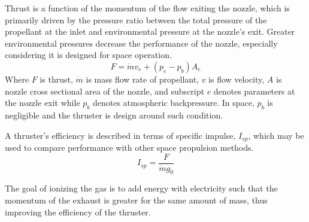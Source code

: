 \documentclass[journal]{IEEEtran}
\begin{document}

Thrust is a function of the momentum of the flow exiting the nozzle, which is primarily driven by the pressure ratio between the total pressure of the propellant at the inlet and environmental pressure at the nozzle's exit.
Greater environmental pressures decrease the performance of the nozzle, especially considering it is designed for space operation.
\begin{equation}
\label{eq:thrust}
  F=\dot{m}v_e + (p_e-p_b)A_e
\end{equation}
 Where $F$ is thrust, $\dot{m}$ is mass flow rate of propellant, $v$ is flow velocity, $A$ is nozzle cross sectional area of the nozzle, and subscript $e$ denotes parameters at the nozzle exit while $p_b$ denotes atmospheric backpressure.
 In space, $p_b$ is negligible and the thruster is design around such condition.

 A thruster's efficiency is described in terms of specific impulse, $I_{sp}$, which may be used to compare performance with other space propulsion methods.
 \begin{equation}
 \label{eq:isp}
   I_{sp}=\frac{F}{\dot{m} g_0}
 \end{equation}

The goal of ionizing the gas is to add energy with electricity such that the momentum of the exhaust is greater for the same amount of mass, thus improving the efficiency of the thruster.

\end{document}
